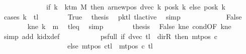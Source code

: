 \begin{isabellebody}
\ \ \ \ \ \ \ \ \ \ \ \ {\isacharequal}{\kern0pt}\ {\isacharparenleft}{\kern0pt}if\ k\ {\isacharless}{\kern0pt}\ k{\isacharunderscore}{\kern0pt}tm\ M\ then\ ar{\isacharunderscore}{\kern0pt}newpos\ {\isacharparenleft}{\kern0pt}dvec\ k{\isacharparenright}{\kern0pt}\ {\isacharparenleft}{\kern0pt}posk{}\ k{\isacharparenright}{\kern0pt}\ else\ posk{}\ k{\isacharparenright}{\kern0pt}{\isachardoublequoteclose}\isanewline
\ \ \ \ \isamarkupfalse%
\ {\isacharparenleft}{\kern0pt}cases\ {\isachardoublequoteopen}k\ {\isacharequal}{\kern0pt}\ {\isacharquery}{\kern0pt}tl{\isachardoublequoteclose}{\isacharparenright}{\kern0pt}\isanewline
\ \ \ \ \ \ \isamarkupfalse%
\ True\ \isamarkupfalse%
\ {\isacharquery}{\kern0pt}thesis\ \isamarkupfalse%
\ pk{\isacharunderscore}{\kern0pt}tl\ tl{\isacharunderscore}{\kern0pt}active\ \isamarkupfalse%
\ simp\isanewline
\ \ \ \ \isamarkupfalse%
\isanewline
\ \ \ \ \ \ \isamarkupfalse%
\ False\isanewline
\ \ \ \ \ \ \isamarkupfalse%
\ kne{\isacharcolon}{\kern0pt}\ {\isachardoublequoteopen}k\ {\isasymnoteq}\ {\isacharquery}{\kern0pt}m{}{\isachardoublequoteclose}\ \isamarkupfalse%
\ tl{\isacharunderscore}{\kern0pt}eq\ \isamarkupfalse%
\ simp\isanewline
\ \ \ \ \ \ \isamarkupfalse%
\ {\isacharquery}{\kern0pt}thesis\ \isamarkupfalse%
\ False\ kne\ cond{\isacharbrackleft}{\kern0pt}OF\ kne{\isacharbrackright}{\kern0pt}\ \isamarkupfalse%
\ {\isacharparenleft}{\kern0pt}simp\ add{\isacharcolon}{\kern0pt}\ k{\isacharunderscore}{\kern0pt}idx{\isacharunderscore}{\kern0pt}def{\isacharparenright}{\kern0pt}\isanewline
\ \ \ \ \isamarkupfalse%
\isanewline
\ \ \isamarkupfalse%
\isanewline
\ \ \isamarkupfalse%
\ ps{\isacharunderscore}{\kern0pt}full{\isacharcolon}{\kern0pt}\ {\isachardoublequoteopen}{\isacharparenleft}{\kern0pt}if\ dvec\ {\isacharquery}{\kern0pt}tl\ {\isacharequal}{\kern0pt}\ dir{\isachardot}{\kern0pt}R\ then\ mt{\isacharunderscore}{\kern0pt}pos\ c{}\isanewline
\ \ \ \ \ \ \ \ \ \ \ \ \ \ \ \ \ \ \ else\ {\isacharparenleft}{\kern0pt}mt{\isacharunderscore}{\kern0pt}pos\ c{}{\isacharparenright}{\kern0pt}{\isacharparenleft}{\kern0pt}{\isacharquery}{\kern0pt}tl\ {\isacharcolon}{\kern0pt}{\isacharequal}{\kern0pt}\ mt{\isacharunderscore}{\kern0pt}pos\ c{}\ {\isacharquery}{\kern0pt}tl\isanewline

\end{isabellebody}
